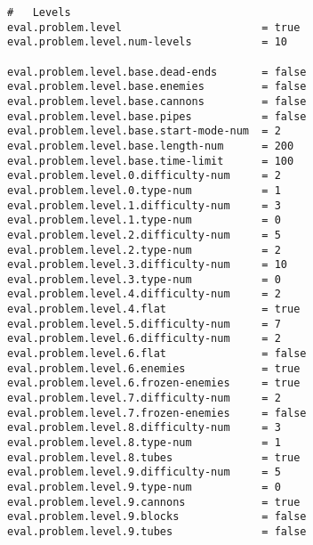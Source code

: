 \begin{minipage}{0.9\linewidth}
\begin{lstlisting}
#	Levels
eval.problem.level						= true
eval.problem.level.num-levels			= 10

eval.problem.level.base.dead-ends 		= false
eval.problem.level.base.enemies			= false
eval.problem.level.base.cannons			= false
eval.problem.level.base.pipes			= false
eval.problem.level.base.start-mode-num  = 2
eval.problem.level.base.length-num		= 200
eval.problem.level.base.time-limit		= 100
eval.problem.level.0.difficulty-num		= 2
eval.problem.level.0.type-num			= 1
eval.problem.level.1.difficulty-num		= 3
eval.problem.level.1.type-num			= 0
eval.problem.level.2.difficulty-num		= 5
eval.problem.level.2.type-num			= 2
eval.problem.level.3.difficulty-num		= 10
eval.problem.level.3.type-num			= 0
eval.problem.level.4.difficulty-num		= 2
eval.problem.level.4.flat				= true
eval.problem.level.5.difficulty-num		= 7
eval.problem.level.6.difficulty-num		= 2
eval.problem.level.6.flat				= false
eval.problem.level.6.enemies			= true
eval.problem.level.6.frozen-enemies		= true
eval.problem.level.7.difficulty-num		= 2
eval.problem.level.7.frozen-enemies		= false
eval.problem.level.8.difficulty-num		= 3
eval.problem.level.8.type-num			= 1
eval.problem.level.8.tubes				= true
eval.problem.level.9.difficulty-num		= 5
eval.problem.level.9.type-num			= 0
eval.problem.level.9.cannons			= true
eval.problem.level.9.blocks				= false
eval.problem.level.9.tubes				= false
\end{lstlisting}
\end{minipage}

